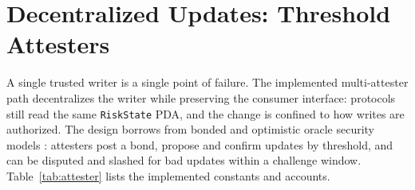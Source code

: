 \documentclass[aps,prx,reprint,nofootinbib,longbibliography]{revtex4-2}
\begin{document}
\section{Decentralized Updates: Threshold Attesters}
\label{sec:attester}

A single trusted writer is a single point of failure. The implemented
multi-attester path decentralizes the writer while preserving the consumer
interface: protocols still read the same \texttt{RiskState} PDA, and the change is
confined to how writes are authorized. The design borrows from bonded and
optimistic oracle security models \cite{uma_optimistic_oracle,breidenbach2021chainlink}:
attesters post a bond, propose and confirm updates by threshold, and can be
disputed and slashed for bad updates within a challenge window. Table~\ref{tab:attester}
lists the implemented constants and accounts.

\begin{table}[h]
\caption{\label{tab:attester}Implemented threshold-attester constants and accounts.}
\end{table}
\end{document}
